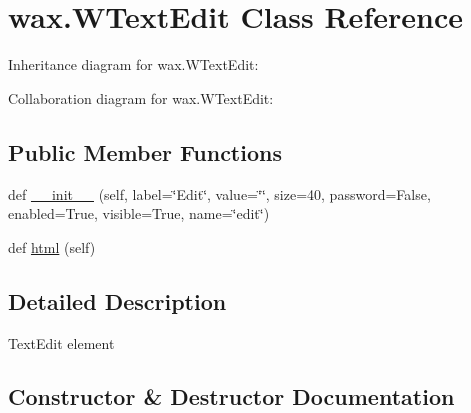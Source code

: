 \hypertarget{classwax_1_1WTextEdit}{}\section{wax.\+W\+Text\+Edit Class Reference}
\label{classwax_1_1WTextEdit}


Inheritance diagram for wax.\+W\+Text\+Edit\+:


Collaboration diagram for wax.\+W\+Text\+Edit\+:
\subsection*{Public Member Functions}
\begin{DoxyCompactItemize}
\item 
def \hyperlink{classwax_1_1WTextEdit_a3c25c540da61c668247742b20c193066}{\+\_\+\+\_\+init\+\_\+\+\_\+} (self, label=\char`\"{}Edit\char`\"{}, value=\char`\"{}\char`\"{}, size=40, password=False, enabled=True, visible=True, name=\char`\"{}edit\char`\"{})
\item 
def \hyperlink{classwax_1_1WTextEdit_ad6a22b65606b4b2c1061ea07a479ad48}{html} (self)
\end{DoxyCompactItemize}


\subsection{Detailed Description}
\begin{DoxyVerb}TextEdit element
\end{DoxyVerb}
 

\subsection{Constructor \& Destructor Documentation}
